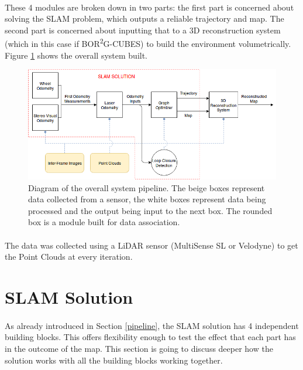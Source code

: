 \documentclass[11pt]{article}
\begin{document}
	\paragraph{}
	These 4 modules are broken down in two parts: the first part is concerned about solving the SLAM problem, which outputs a reliable trajectory and map. The second part is concerned about inputting that to a 3D reconstruction system (which in this case if BOR\textsuperscript{2}G-CUBES) to build the environment volumetrically. Figure \ref{fig:SystemPipelineFigure1} shows the overall system built.
	\begin{figure}[h]
		\includegraphics[width=\linewidth]{SystemPipeline}
		\caption{Diagram of the overall system pipeline. The beige boxes represent data collected from a sensor, the white boxes represent data being processed and the output being input to the next box. The rounded box is a module built for data association.}
		\label{fig:SystemPipelineFigure1}
	\end{figure}
	
	\paragraph{}
	The data was collected using a LiDAR sensor (MultiSense SL or Velodyne) to get the Point Clouds at every iteration.
	\newpage
	\section{SLAM Solution}
	\paragraph{}
	As already introduced in Section \ref{pipeline}, the SLAM solution has 4 independent building blocks. This offers flexibility enough to test the effect that each part has in the outcome of the map. This section is going to discuss deeper how the solution works with all the building blocks working together. 
	 
\end{document}
